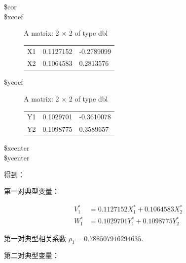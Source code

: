\documentclass[11pt]{article}
\begin{document}
    \begin{description}
\item[\$cor] 

\item[\$xcoef] A matrix: 2 × 2 of type dbl
\begin{tabular}{r|ll}
	X1 & 0.1127152 & -0.2789099\\
	X2 & 0.1064583 &  0.2813576\\
\end{tabular}

\item[\$ycoef] A matrix: 2 × 2 of type dbl
\begin{tabular}{r|ll}
	Y1 & 0.1029701 & -0.3610078\\
	Y2 & 0.1098775 &  0.3589657\\
\end{tabular}

\item[\$xcenter] 

\item[\$ycenter] 

\end{description}


    
    得到：

第一对典型变量：

\[
\begin{aligned}
V_1^* &= 0.1127152 X_1^* + 0.1064583 X_2^* \\
W_1^* &= 0.1029701 Y_1^* + 0.1098775 Y_2^*
\end{aligned}
\]

第一对典型相关系数 \(\rho_1 = 0.788507916294635\).

第二对典型变量：
\end{document}
